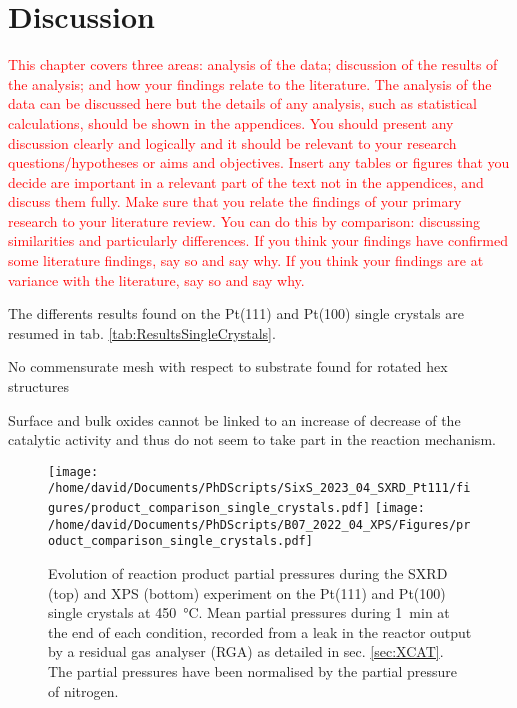 \section{Discussion}

\textcolor{red}{This chapter covers three areas: analysis of the data; discussion of the results of the analysis; and how your findings relate to the literature. The analysis of the data can be discussed here but the details of any analysis, such as statistical calculations, should be shown in the appendices. You should present any discussion clearly and logically and it should be relevant to your research questions/hypotheses or aims and objectives. Insert any tables or figures that you decide are important in a relevant part of the text not in the appendices, and discuss them fully. Make sure that you relate the findings of your primary research to your literature review. You can do this by comparison: discussing similarities and particularly differences. If you think your findings have confirmed some literature findings, say so and say why. If you think your findings are at variance with the literature, say so and say why.}

The differents results found on the Pt(111) and Pt(100) single crystals are resumed in tab. \ref{tab:ResultsSingleCrystals}.


No commensurate mesh with respect to substrate found for rotated hex structures


Surface and bulk oxides cannot be linked to an increase of decrease of the catalytic activity and thus do not seem to take part in the reaction mechanism.

\begin{figure}[!htb]
    \centering
    \texttt{[image: /home/david/Documents/PhDScripts/SixS\_2023\_04\_SXRD\_Pt111/figures/product\_comparison\_single\_crystals.pdf]}
    \texttt{[image: /home/david/Documents/PhDScripts/B07\_2022\_04\_XPS/Figures/product\_comparison\_single\_crystals.pdf]}
    \caption{
        Evolution of reaction product partial pressures during the SXRD (top) and XPS (bottom) experiment on the Pt(111) and Pt(100) single crystals at \qty{450}{\degreeCelsius}.
        Mean partial pressures during \qty{1}{\minute} at the end of each condition, recorded from a leak in the reactor output by a residual gas analyser (RGA) as detailed in sec. \ref{sec:XCAT}.
        The partial pressures have been normalised by the partial pressure of nitrogen.
    }
    \label{fig:RGA450Pt111AndPt100}
\end{figure}

